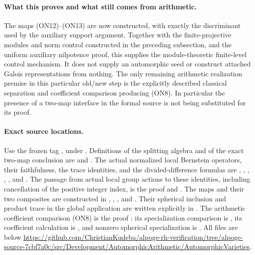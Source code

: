 \paragraph{What this proves and what still comes from arithmetic.}
The maps (ON12)--(ON13) are now constructed, with exactly the
discriminant used by the auxiliary support argument.  Together with
the finite-projective modules and norm control constructed in the
preceding subsection, and the uniform auxiliary nilpotence proof,
this supplies the module-theoretic finite-level control mechanism.
It does not supply an automorphic seed or construct attached Galois
representations from nothing.
The only remaining arithmetic realization premise in this particular
old/new step is the explicitly described classical separation and
coefficient comparison producing (ON8).
In particular the presence of a two-map interface in the formal
source is not being substituted for its proof.

\paragraph{Exact source locations.}
Use the frozen tag , under
.
Definitions of the splitting algebra and of the exact two-map
conclusion are
 and
.
The actual normalized local Bernstein operators, their faithfulness,
the trace identities, and the divided-difference formulas are
,
,
,
,
, and
.
The passage from actual local group actions to these identities,
including cancellation of the positive integer index, is the proof
 and
.
The maps and their two composites are constructed in
, ,
, and .
Their spherical inclusion and product trace in the global application
are written explicitly in
.
The arithmetic coefficient comparison (ON8) is the proof
:
its specialization comparison is , its coefficient
calculation is , and nonzero spherical specialization
is .
All files are below
\url{https://github.com/ChristianKudeba/alpoge-rh-verification/tree/alpoge-source-7cbf7a0c/src/Development/AutomorphicArithmetic/AutomorphicVarieties}.

